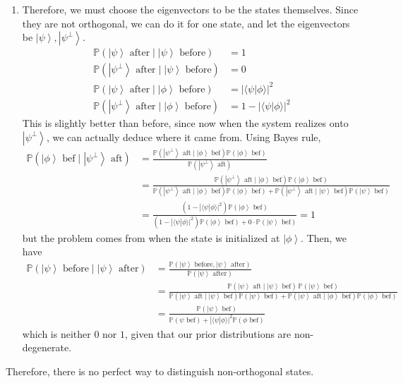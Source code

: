 \documentclass{article}
\newcommand{\ket}[1]{\ensuremath{\left|#1\right\rangle}}
\newcommand{\braket}[2]{\langle #1 | #2 \rangle}
\begin{document}
\begin{enumerate}
      \item Therefore, we must choose the eigenvectors to be the states themselves. Since they are not orthogonal, we can do it for one state, and let the eigenvectors be $\ket{\psi}, \ket{\psi^\perp}$. 
        \begin{align} 
          \mathbb{P}(\ket{\psi} \text{ after} \mid \ket{\psi} \text{ before}) & = 1 \\
          \mathbb{P}(\ket{\psi^\perp} \text{ after} \mid \ket{\psi} \text{ before}) & = 0 \\
          \mathbb{P}(\ket{\psi} \text{ after} \mid \ket{\phi} \text{ before}) & = |\braket{\psi}{\phi}|^2 \\
          \mathbb{P}(\ket{\psi^\perp} \text{ after} \mid \ket{\phi} \text{ before}) & = 1 - |\braket{\psi}{\phi}|^2
        \end{align}
        This is slightly better than before, since now when the system realizes onto $\ket{\psi^\perp}$, we can actually deduce where it came from. Using Bayes rule, 
        \begin{align} 
          \mathbb{P}(\ket{\phi} \text{ bef} \mid \ket{\psi^\perp} \text{ aft}) 
          & =  \frac{\mathbb{P}(\ket{\psi^\perp} \text{ aft} \mid \ket{\phi} \text{ bef}) \mathbb{P}(\ket{\phi} \text{ bef})}{\mathbb{P}(\ket{\psi^\perp} \text{ aft})} \\ 
          & =  \frac{\mathbb{P}(\ket{\psi^\perp} \text{ aft} \mid \ket{\phi} \text{ bef}) \mathbb{P}(\ket{\phi} \text{ bef})}{\mathbb{P}(\ket{\psi^\perp} \text{ aft} \mid \ket{\phi} \text{ bef}) \mathbb{P}(\ket{\phi} \text{ bef}) + \mathbb{P}(\ket{\psi^\perp} \text{ aft} \mid \ket{\psi} \text{ bef}) \mathbb{P}(\ket{\psi} \text{ bef})} \\
          & = \frac{(1 - |\braket{\psi}{\phi}|^2) \mathbb{P}(\ket{\phi} \text{ bef})}{(1 - |\braket{\psi}{\phi}|^2) \mathbb{P}(\ket{\phi} \text{ bef}) + 0 \cdot \mathbb{P}(\ket{\psi} \text{ bef})} = 1
        \end{align}
        but the problem comes from when the state is initialized at $\ket{\phi}$. Then, we have 
        \begin{align} 
          \mathbb{P}(\ket{\psi} \text{ before} \mid \ket{\psi} \text{ after}) 
          & = \frac{\mathbb{P}(\ket{\psi} \text{ before}, \ket{\psi} \text{ after})}{\mathbb{P}(\ket{\psi} \text{ after})} \\ 
          & = \frac{\mathbb{P}(\ket{\psi} \text{ aft} \mid \ket{\psi} \text{ bef}) \, \mathbb{P}(\ket{\psi} \text{ bef})}{\mathbb{P}(\ket{\psi} \text{ aft} \mid \ket{\psi} \text{ bef}) \mathbb{P}(\ket{\psi} \text{ bef})+ \mathbb{P}(\ket{\psi} \text{ aft} \mid \ket{\phi} \text{ bef}) \mathbb{P}(\ket{\phi} \text{ bef})} \\
          & = \frac{\mathbb{P}(\ket{\psi} \text{ bef})}{\mathbb{P}(\psi \text{ bef}) + |\braket{\psi}{\phi}|^2 \mathbb{P}(\phi \text{ bef})} 
        \end{align}
        which is neither $0$ nor $1$, given that our prior distributions are non-degenerate. 
    \end{enumerate}
    Therefore, there is no perfect way to distinguish non-orthogonal states. 
\end{document}
